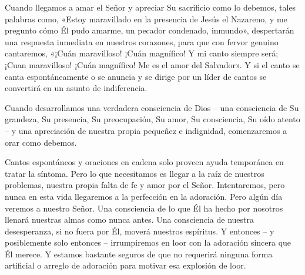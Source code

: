 \documentclass[12pt, twoside, openright]{book}
\begin{document}
Cuando llegamos a amar el Señor y apreciar Su sacrificio como lo debemos, tales palabras como, «Estoy maravillado en la presencia de Jesús el Nazareno, y me pregunto cómo Él pudo amarme, un pecador condenado, inmundo», despertarán una respuesta inmediata en nuestros corazones, para que con fervor genuino cantaremos, «¡Cuán maravilloso! ¡Cuán magnífico! Y mi canto siempre será; ¡Cuan maravilloso! ¡Cuán magnífico! Me es el amor del Salvador». Y si el canto se canta espontáneamente o se anuncia y se dirige por un líder de cantos se convertirá en un asunto de indiferencia.

Cuando desarrollamos una verdadera consciencia de Dios – una consciencia de Su grandeza, Su presencia, Su preocupación, Su amor, Su consciencia, Su oído atento – y una apreciación de nuestra propia pequeñez e indignidad, comenzaremos a orar como debemos.

Cantos espontáneos y oraciones en cadena solo proveen ayuda temporánea en tratar la síntoma. Pero lo que necesitamos es llegar a la raíz de nuestros problemas, nuestra propia falta de fe y amor por el Señor.
Intentaremos, pero nunca en esta vida llegaremos a la perfección en la adoración. Pero algún día veremos a nuestro Señor. Una consciencia de lo que Él ha hecho por nosotros llenará nuestras almas como nunca antes. Una consciencia de nuestra desesperanza, si no fuera por Él, moverá nuestros espíritus. Y entonces – y posiblemente solo entonces – irrumpiremos en loor con la adoración sincera que Él merece. Y estamos bastante seguros de que no requerirá ninguna forma artificial o arreglo de adoración para motivar esa explosión de loor.
\end{document}
